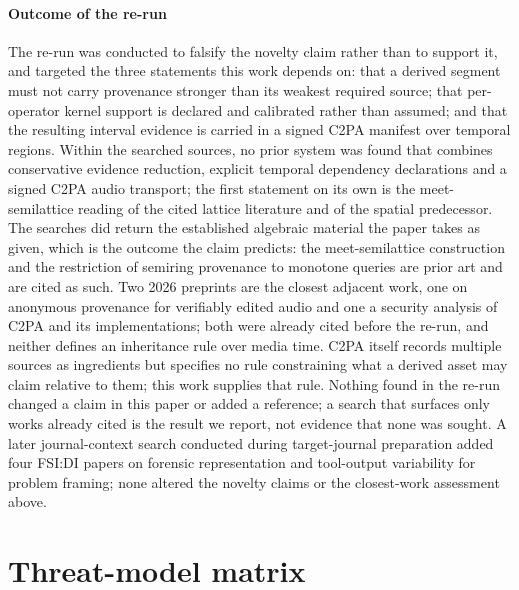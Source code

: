 \documentclass[11pt]{article}
\begin{document}
\paragraph{Outcome of the re-run} The re-run was conducted to falsify the
novelty claim rather than to support it, and targeted the three statements this
work depends on: that a derived segment must not carry provenance stronger than
its weakest required source; that per-operator kernel support is declared and
calibrated rather than assumed; and that the resulting interval evidence is
carried in a signed C2PA manifest over temporal regions. Within the searched
sources, no prior system was found that combines conservative evidence
reduction, explicit temporal dependency declarations and a signed C2PA audio
transport; the first statement on its own is the meet-semilattice reading of
the cited lattice literature and of the spatial predecessor. The searches did return the established algebraic
material the paper takes as given, which is the outcome the claim predicts: the
meet-semilattice construction and the restriction of semiring provenance to
monotone queries are prior art and are cited as such. Two 2026 preprints are the
closest adjacent work, one on anonymous provenance for verifiably edited audio
and one a security analysis of C2PA and its implementations; both were already
cited before the re-run, and neither defines an inheritance rule over media
time. C2PA itself records multiple sources as ingredients but specifies no rule
constraining what a derived asset may claim relative to them; this work
supplies that rule. Nothing found in the re-run changed a claim in this paper
or added a reference; a search that surfaces only works already cited is the
result we report, not evidence that none was sought. A later journal-context
search conducted during target-journal preparation added four FSI:DI papers on
forensic representation and tool-output variability for problem framing; none
altered the novelty claims or the closest-work assessment above.

\section{Threat-model matrix}
\label{s:threat}
\end{document}
